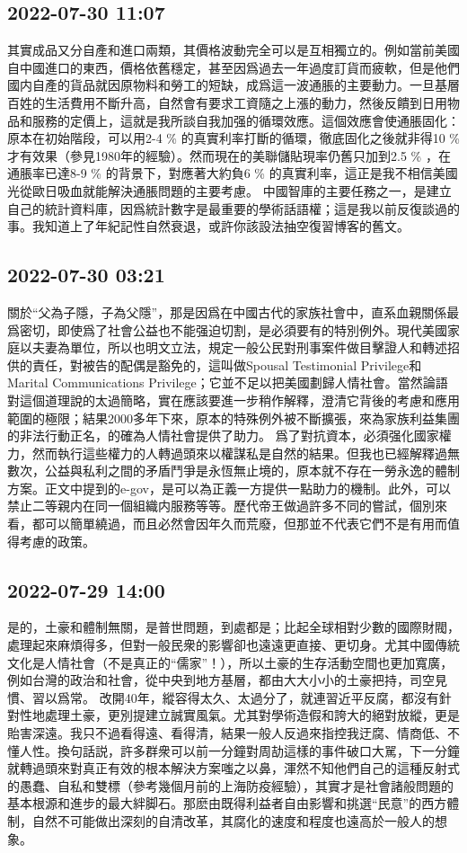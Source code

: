 \documentclass[twocolumn]{ctexart}
\begin{document}
\subsection*{2022-07-30 11:07}

其實成品又分自產和進口兩類，其價格波動完全可以是互相獨立的。例如當前美國自中國進口的東西，價格依舊穩定，甚至因爲過去一年過度訂貨而疲軟，但是他們國内自產的貨品就因原物料和勞工的短缺，成爲這一波通脹的主要動力。一旦基層百姓的生活費用不斷升高，自然會有要求工資隨之上漲的動力，然後反饋到日用物品和服務的定價上，這就是我所談自我加强的循環效應。這個效應會使通脹固化：原本在初始階段，可以用2-4 \% 的真實利率打斷的循環，徹底固化之後就非得10 \% 才有效果（參見1980年的經驗）。然而現在的美聯儲貼現率仍舊只加到2.5 \% ，在通脹率已達8-9 \% 的背景下，對應著大約負6 \% 的真實利率，這正是我不相信美國光從歐日吸血就能解決通脹問題的主要考慮。
中國智庫的主要任務之一，是建立自己的統計資料庫，因爲統計數字是最重要的學術話語權；這是我以前反復談過的事。我知道上了年紀記性自然衰退，或許你該設法抽空復習博客的舊文。
\subsection*{2022-07-30 03:21}

關於“父為子隱，子為父隱”，那是因爲在中國古代的家族社會中，直系血親關係最爲密切，即使爲了社會公益也不能强迫切割，是必須要有的特別例外。現代美國家庭以夫妻為單位，所以也明文立法，規定一般公民對刑事案件做目擊證人和轉述招供的責任，對被告的配偶是豁免的，這叫做Spousal Testimonial Privilege和Marital Communications Privilege；它並不足以把美國劃歸人情社會。當然論語對這個道理說的太過簡略，實在應該要進一步稍作解釋，澄清它背後的考慮和應用範圍的極限；結果2000多年下來，原本的特殊例外被不斷擴張，來為家族利益集團的非法行動正名，的確為人情社會提供了助力。
爲了對抗資本，必須强化國家權力，然而執行這些權力的人轉過頭來以權謀私是自然的結果。但我也已經解釋過無數次，公益與私利之間的矛盾鬥爭是永恆無止境的，原本就不存在一勞永逸的體制方案。正文中提到的e-gov，是可以為正義一方提供一點助力的機制。此外，可以禁止二等親内在同一個組織内服務等等。歷代帝王做過許多不同的嘗試，個別來看，都可以簡單繞過，而且必然會因年久而荒廢，但那並不代表它們不是有用而值得考慮的政策。
\subsection*{2022-07-29 14:00}

是的，土豪和體制無關，是普世問題，到處都是；比起全球相對少數的國際財閥，處理起來麻煩得多，但對一般民衆的影響卻也遠遠更直接、更切身。尤其中國傳統文化是人情社會（不是真正的“儒家”！），所以土豪的生存活動空間也更加寬廣，例如台灣的政治和社會，從中央到地方基層，都由大大小小的土豪把持，司空見慣、習以爲常。
改開40年，縱容得太久、太過分了，就連習近平反腐，都沒有針對性地處理土豪，更別提建立誠實風氣。尤其對學術造假和誇大的絕對放縱，更是貽害深遠。我只不過看得遠、看得清，結果一般人反過來指控我迂腐、情商低、不懂人性。換句話説，許多群衆可以前一分鐘對周劼這樣的事件破口大駡，下一分鐘就轉過頭來對真正有效的根本解決方案嗤之以鼻，渾然不知他們自己的這種反射式的愚蠢、自私和雙標（參考幾個月前的上海防疫經驗），其實才是社會諸般問題的基本根源和進步的最大絆脚石。那麽由既得利益者自由影響和挑選“民意”的西方體制，自然不可能做出深刻的自清改革，其腐化的速度和程度也遠高於一般人的想象。
\end{document}
